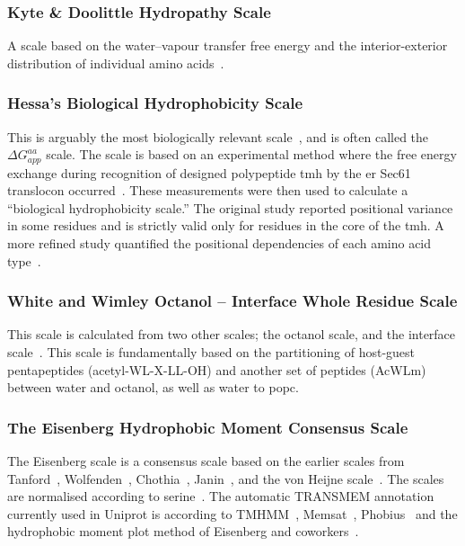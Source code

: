
\subsubsection{Kyte \& Doolittle Hydropathy Scale}

A scale based on the water\---vapour transfer free energy and the interior-exterior distribution of individual amino acids~\cite{Kyte1982}.

\subsubsection{Hessa's Biological Hydrophobicity Scale}

This is arguably the most biologically relevant scale~\cite{Peters2014}, and is often called the ${\Delta G}_{app}^{aa}$ scale. The scale is based on an experimental method where the free energy exchange during recognition of designed polypeptide \gls{tmh} by the \gls{er} Sec61 translocon occurred~\cite{Hessa2005}. These measurements were then used to calculate a “biological hydrophobicity scale.” The original study reported positional variance in some residues and is strictly valid only for residues in the core of the \gls{tmh}. A more refined study quantified the positional dependencies of each amino acid type~\cite{Hessa2007}.

\subsubsection{White and Wimley Octanol \--- Interface Whole Residue Scale}

This scale is calculated from two other scales; the octanol scale, and the interface scale~\cite{White1999}. This scale is fundamentally based on the partitioning of host-guest pentapeptides (acetyl-WL-X-LL-OH) and another set of peptides (AcWLm) between water and octanol, as well as water to \gls{popc}.

\subsubsection{The Eisenberg Hydrophobic Moment Consensus Scale}

The Eisenberg scale is a consensus scale based on the earlier scales from Tanford~\cite{Nozaki1971}, Wolfenden~\cite{Rose1993}, Chothia~\cite{Chothia1976}, Janin~\cite{Janin1979}, and the von Heijne scale~\cite{VonHeijne1979}. The scales are normalised according to serine~\cite{Eisenberg1984}. The automatic TRANSMEM annotation currently used in Uniprot is according to TMHMM~\cite{Krogh2001}, Memsat~\cite{Jones2007}, Phobius~\cite{Kall2004} and the hydrophobic moment plot method of Eisenberg and coworkers~\cite{Eisenberg1984}.



